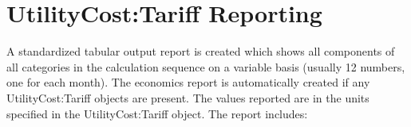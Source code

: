 \section{UtilityCost:Tariff Reporting}\label{utilitycosttariff-reporting}

A standardized tabular output report is created which shows all components of all categories in the calculation sequence on a variable basis (usually 12 numbers, one for each month). The economics report is automatically created if any UtilityCost:Tariff objects are present. The values reported are in the units specified in the UtilityCost:Tariff object. The report includes:
